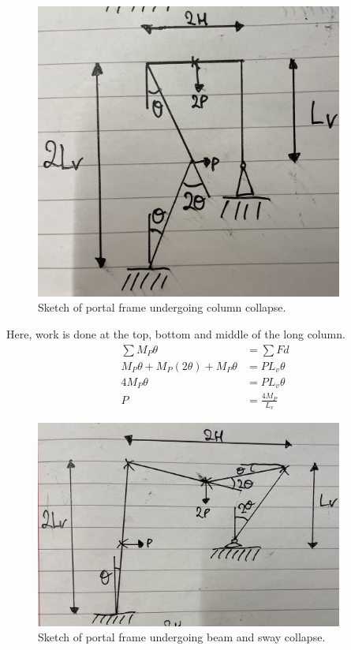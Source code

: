 \documentclass[11pt]{article}
\numberwithin{equation}{section}
\begin{document}
\begin{figure}[H]
    \centering
    \includegraphics[width = 0.9\textwidth]{./img/q3i5.jpg}
    \caption{Sketch of portal frame undergoing column collapse.}
\end{figure}
Here, work is done at the top, bottom and middle of the long column.
\begin{align}
    \sum M_P \theta &= \sum Fd\\
    M_P \theta + M_P(2\theta) + M_P\theta &= PL_v \theta\\
    4M_P \theta &= PL_v\theta\\
    P &= \frac{4M_P}{L_v}
\end{align}
\begin{figure}[H]
    \centering
    \includegraphics[width = 0.9\textwidth]{./img/q3i6.jpg}
    \caption{Sketch of portal frame undergoing beam and sway collapse.}
\end{figure}
\end{document}
